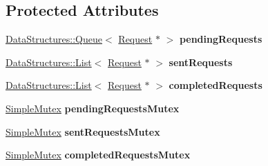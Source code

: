 \subsection*{Protected Attributes}
\begin{DoxyCompactItemize}
\item 
\hypertarget{class_rak_net_1_1_h_t_t_p_connection2_ab99cb5eee8f3981cd1dacd09b3e5d996}{\hyperlink{class_data_structures_1_1_queue}{Data\-Structures\-::\-Queue}$<$ \hyperlink{struct_rak_net_1_1_h_t_t_p_connection2_1_1_request}{Request} $\ast$ $>$ {\bfseries pending\-Requests}}\label{class_rak_net_1_1_h_t_t_p_connection2_ab99cb5eee8f3981cd1dacd09b3e5d996}

\item 
\hypertarget{class_rak_net_1_1_h_t_t_p_connection2_afa5f8afc847afd2eb335d0bf675deb33}{\hyperlink{class_data_structures_1_1_list}{Data\-Structures\-::\-List}$<$ \hyperlink{struct_rak_net_1_1_h_t_t_p_connection2_1_1_request}{Request} $\ast$ $>$ {\bfseries sent\-Requests}}\label{class_rak_net_1_1_h_t_t_p_connection2_afa5f8afc847afd2eb335d0bf675deb33}

\item 
\hypertarget{class_rak_net_1_1_h_t_t_p_connection2_a1decb6b55ad3bef18fb12dff722b4a16}{\hyperlink{class_data_structures_1_1_list}{Data\-Structures\-::\-List}$<$ \hyperlink{struct_rak_net_1_1_h_t_t_p_connection2_1_1_request}{Request} $\ast$ $>$ {\bfseries completed\-Requests}}\label{class_rak_net_1_1_h_t_t_p_connection2_a1decb6b55ad3bef18fb12dff722b4a16}

\item 
\hypertarget{class_rak_net_1_1_h_t_t_p_connection2_a621cc4ae29a9f0248a92ec9da726fde5}{\hyperlink{class_rak_net_1_1_simple_mutex}{Simple\-Mutex} {\bfseries pending\-Requests\-Mutex}}\label{class_rak_net_1_1_h_t_t_p_connection2_a621cc4ae29a9f0248a92ec9da726fde5}

\item 
\hypertarget{class_rak_net_1_1_h_t_t_p_connection2_a0740f959ee1526ca6bf7b30e5fcb3c97}{\hyperlink{class_rak_net_1_1_simple_mutex}{Simple\-Mutex} {\bfseries sent\-Requests\-Mutex}}\label{class_rak_net_1_1_h_t_t_p_connection2_a0740f959ee1526ca6bf7b30e5fcb3c97}

\item 
\hypertarget{class_rak_net_1_1_h_t_t_p_connection2_a993e00f238c841a19642d892cc0f26dc}{\hyperlink{class_rak_net_1_1_simple_mutex}{Simple\-Mutex} {\bfseries completed\-Requests\-Mutex}}\label{class_rak_net_1_1_h_t_t_p_connection2_a993e00f238c841a19642d892cc0f26dc}

\end{DoxyCompactItemize}


